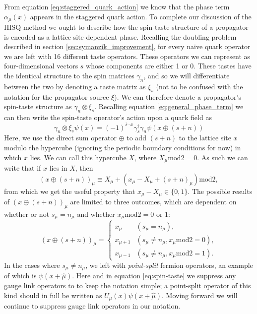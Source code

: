 From equation \ref{eq:staggered_quark_action} we know that the phase term $\alpha_\mu(x)$ appears in the staggered quark action. To complete our discussion of the HISQ method we ought to describe how the spin-taste structure of a propagator is encoded as a lattice site dependent phase.  Recalling the doubling problem described in section \ref{sec:symanzik_improvement}, for every naive quark operator we are left with 16 different taste operators.  These operators we can represent as four-dimensional vectors $s$ whose components are either 1 or 0.  These tastes have the identical structure to the spin matrices $\gamma_n$, and so we will differentiate between the two by denoting a taste matrix as  $\xi_s$ (not to be confused with the notation for the propagator source $\xi$).  We can therefore denote a propagator's spin-taste structure as $\gamma_n \otimes \xi_s$.  Recalling equation \ref{eq:general_phase_term} we can then write the spin-taste operator's action upon a quark field as
\begin{equation}\label{eq:spin-taste}
    \gamma_n \otimes \xi_s \psi(x) = (-1)^{\overline{s}\cdot x} \gamma^\dagger_s \gamma_n \psi(x \oplus (s+n))
\end{equation}
Here, we use the direct sum operator $\oplus$ to add $(s+n)$ to the lattice site $x$ modulo the hypercube (ignoring the periodic boundary conditions for now) in which $x$ lies. We can call this hypercube $X$, where $X_\mu\mathrm{mod}2 = 0$.  As such we can write that if $x$ lies in $X$, then 
\begin{equation}\label{eq:spin-taste_pt2}
    (x \oplus (s+n))_\mu \equiv X_\mu + (x_\mu  - X_\mu+(s+n)_\mu)\mathrm{mod}2,
\end{equation}
from which we get the useful property that $x_\mu - X_\mu \in \{0,1\}$.  The possible results of $(x \oplus (s+n))_\mu$ are limited to three outcomes, which are dependent on whether or not $s_\mu = n_\mu$ and whether $x_\mu \mathrm{mod}2=0$ or $1$:
\begin{equation}
    (x \oplus (s+n))_\mu = 
    \begin{cases}
        x_\mu   &(s_\mu = n_\mu),\\
        x_{\mu+1}  &(s_\mu \neq n_\mu, x_\mu \mathrm{mod}2=0),\\
        x_{\mu-1}  &(s_\mu \neq n_\mu, x_\mu \mathrm{mod}2=1).
    \end{cases}
\end{equation}
In the cases where $s_\mu \neq n_\mu$, we left with \textit{point-split} fermion operators, an example of which is $\psi(x+\hat{\mu})$.  Here and in equation \ref{eq:spin-taste} we suppress any gauge link operators to to keep the notation simple; a point-split operator of this kind should in full be written as $U_\mu(x)\psi(x+\hat{\mu})$.  Moving forward we will continue to suppress gauge link operators in our notation.

